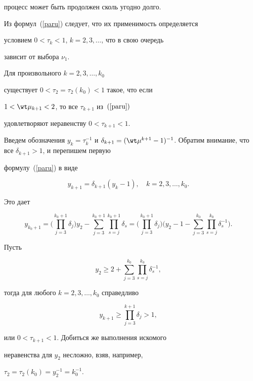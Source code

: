 процесс может быть продолжен сколь угодно долго.





Из формул~(\ref{paru}) следует, что их применимость определяется


условием $0 < \tau_k < 1$, $k = 2, 3, \dotsc$, что в свою очередь


зависит от выбора $\nu_1$.





\begin{lem} Для произвольного $k = 2, 3, \dotsc, k_0$


существует $0 < \tau_2 = \tau_2(k_0) < 1$ такое, что если


$1 < \wt \mu_{k+1} < 2$, то все $\tau_{k+1}$ из~$(\ref{paru})$


удовлетворяют неравенству $0 < \tau_{k+1} < 1$.


\end{lem}





\begin{pf}


Введем обозначения $y_k = \tau_k^{-1}$ и $\delta_{k+1} = ( \wt \mu^{k+1}


- 1 )^{-1}$. Обратим внимание, что все $\delta_{k+1} >1$, и перепишем первую


формулу~(\ref{paru}) в виде


$$


y_{k+1} = \delta_{k+1} ( y_k -1 ), \quad k = 2, 3, \dots, k_0.


$$


Это дает


$$


y_{k_0 + 1} = \bigg( \prod_{j=3}^{k_0+1} \delta_j \bigg) y_2 -


\sum_{j=3}^{k_0+1} \prod_{s=j}^{k_0+1} \delta_s =


\bigg( \prod_{j=3}^{k_0+1} \delta_j \bigg) \bigg( y_2 - 1 -


\sum_{j=3}^{k_0} \prod_{s=j}^{k_0} \delta_s^{-1} \bigg).


$$


Пусть


$$


 y_2 \geq 2 +


\sum_{j=3}^{k_0} \prod_{s=j}^{k_0} \delta_s^{-1},


$$


тогда для любого $k = 2, 3, \dotsc, k_0$ справедливо


$$


y_{k + 1} \geq \prod_{j=3}^{k+1} \delta_j > 1,


$$


или $0 < \tau_{k+1} < 1 $. Добиться же выполнения искомого


неравенства для $y_2$ несложно, взяв, например,


$\tau_2 = \tau_2(k_0) = y_2^{-1} = k_0^{-1}$.


\end{pf}






